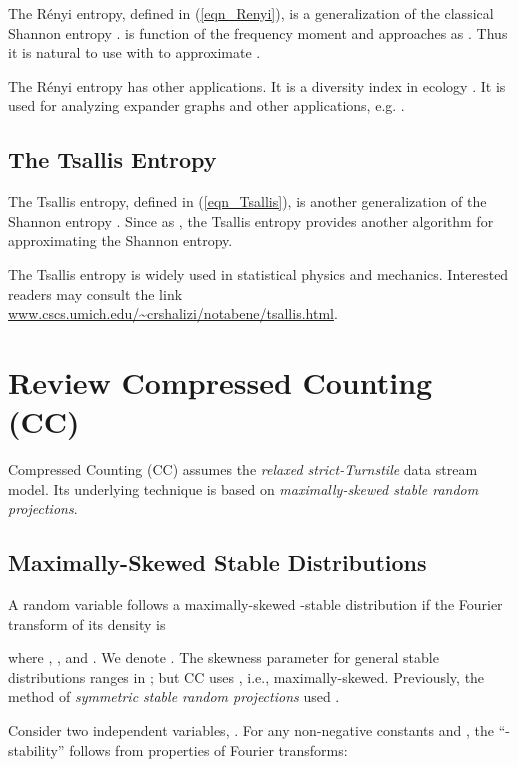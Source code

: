 \documentclass{sig-alternate}
\begin{document}
The R\'enyi entropy,  defined in (\ref{eqn_Renyi}), is a generalization of the classical Shannon entropy .  is function of the frequency moment  and approaches  as . Thus it is natural to use  with  to approximate .

The R\'enyi entropy has other applications. It is a diversity index in ecology \cite{Article:Tothmeresz_95,Article:Ricotta_02,Article:Liu_06}. It is used for analyzing expander graphs\cite{Article:Hoory_06} and other applications, e.g. \cite{Article:Zyczkowski_03}.


\subsection{The Tsallis Entropy}

The Tsallis entropy,   defined in (\ref{eqn_Tsallis}), is another generalization of the Shannon entropy . Since  as , the Tsallis entropy provides another algorithm for approximating the Shannon entropy.

The Tsallis entropy is widely used in statistical physics and  mechanics. Interested readers may consult the link \\ \url{www.cscs.umich.edu/~crshalizi/notabene/tsallis.html}.


\section{Review Compressed Counting (CC)}\label{sec_CC}


Compressed Counting (CC) assumes the {\em relaxed strict-Turnstile} data stream model. Its underlying technique is based on {\em maximally-skewed stable random projections}.

\subsection{Maximally-Skewed Stable Distributions}

A random variable
 follows a maximally-skewed -stable distribution if the Fourier transform of its density  is\cite{Book:Zolotarev_86}

where , , and . We denote .
The skewness parameter  for general stable distributions ranges in ; but CC uses , i.e., maximally-skewed. Previously, the method of {\em symmetric stable random projections}\cite{Article:Indyk_JACM06,Proc:Li_SODA08} used .



Consider two independent variables, . For any non-negative constants  and , the ``-stability'' follows from  properties of Fourier transforms:
\end{document}
